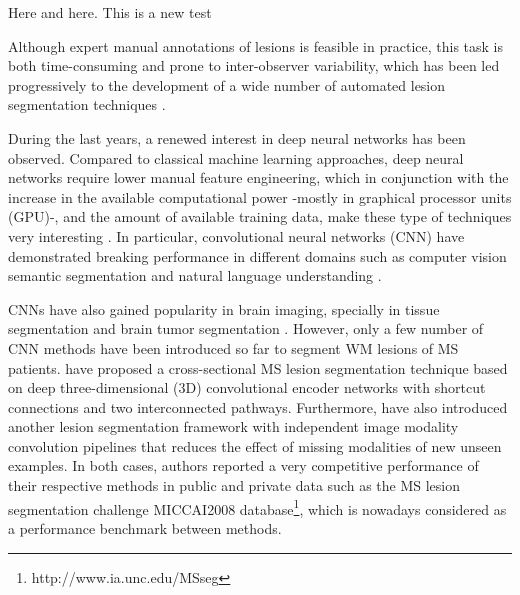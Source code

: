 \documentclass[11pt, authoryear,twocolumn, final]{elsarticle}
\begin{document}
Here and here.  This is a new test 

Although expert manual annotations of lesions is feasible in practice, this task is both time-consuming and prone to inter-observer variability, which has been led progressively to the development of a wide number of automated lesion segmentation techniques \citep{Llado2012, Garcia-Lorenzo2013}.

During the last years, a renewed interest in deep neural networks has been observed. Compared to classical machine learning approaches, deep neural networks require lower manual feature engineering, which in conjunction with the increase in the available computational power -mostly in graphical processor units (GPU)-, and the amount of available training data, make these type of techniques very interesting  \citep{LeCun2015}. In particular, convolutional neural networks (CNN) have demonstrated breaking performance in different domains such as computer vision semantic segmentation \citep{Simonyan2014} and natural language understanding \citep{Sutskever2014}.

CNNs have also gained popularity in brain imaging, specially in tissue segmentation \citep{Zhang2015, Moeskops2016} and brain tumor segmentation \citep{Kamnitsas2016, Pereira2016, Havaei201718}. However, only a few number of CNN methods have been introduced so far to segment WM lesions of MS patients. \citet{Brosch2016} have proposed a cross-sectional MS lesion segmentation technique based on deep three-dimensional (3D) convolutional encoder networks with shortcut connections and two interconnected pathways. Furthermore, \citet{Havaei2016} have also introduced another lesion segmentation framework with independent image modality convolution pipelines that reduces the effect of missing modalities of new unseen examples.
In both cases, authors reported a very competitive performance of their respective methods in public and private data such as the MS lesion segmentation challenge MICCAI2008  database\footnote{http://www.ia.unc.edu/MSseg}, which is nowadays considered as a performance benchmark between methods. 
\end{document}
